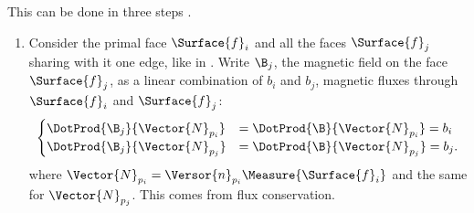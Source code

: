 This can be done in three steps \cite{taflove_advances}.
\begin{enumerate}
\item
  Consider the primal face $\Surface{f}_i$ and all the faces
  $\Surface{f}_j$ sharing with it one edge, like in
  . Write $\B_j$, the magnetic field on the face
  $\Surface{f}_j$, as a linear combination of $b_i$ and $b_j$,
  magnetic fluxes through $\Surface{f}_i$ and $\Surface{f}_j$:
  \begin{equation*} \begin{cases}
      \DotProd{\B_j}{\Vector{N}_{p_i}} & =
      \DotProd{\B}{\Vector{N}_{p_i}} = b_i \\
      \DotProd{\B_j}{\Vector{N}_{p_j}} & =
      \DotProd{\B}{\Vector{N}_{p_j}} = b_j .
  \end{cases} \end{equation*}
  where $\Vector{N}_{p_i} = \Versor{n}_{p_i} \Measure{\Surface{f}_i}$
  and the same for $\Vector{N}_{p_j}$. This comes from flux conservation.
  

\end{enumerate}
